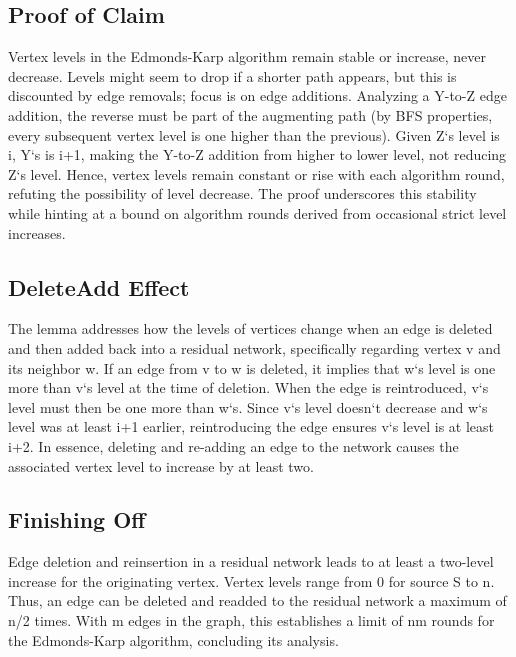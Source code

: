 \subsection*{Proof of Claim}
Vertex levels in the Edmonds-Karp algorithm remain stable or increase, never decrease.
Levels might seem to drop if a shorter path appears, but this is discounted by edge removals; focus is on edge additions.
Analyzing a Y-to-Z edge addition, the reverse must be part of the augmenting path (by BFS properties, every subsequent vertex level is one higher than the previous).
Given Z`s level is i, Y`s is i+1, making the Y-to-Z addition from higher to lower level, not reducing Z`s level.
Hence, vertex levels remain constant or rise with each algorithm round, refuting the possibility of level decrease.
The proof underscores this stability while hinting at a bound on algorithm rounds derived from occasional strict level increases.

\subsection*{DeleteAdd Effect}
The lemma addresses how the levels of vertices change when an edge is deleted and then added back into a residual network, specifically regarding vertex v and its neighbor w.
If an edge from v to w is deleted, it implies that w`s level is one more than v`s level at the time of deletion.
When the edge is reintroduced, v`s level must then be one more than w`s.
Since v`s level doesn`t decrease and w`s level was at least i+1 earlier, reintroducing the edge ensures v`s level is at least i+2.
In essence, deleting and re-adding an edge to the network causes the associated vertex level to increase by at least two.

\subsection*{Finishing Off}
Edge deletion and reinsertion in a residual network leads to at least a two-level increase for the originating vertex.
Vertex levels range from 0 for source S to n.
Thus, an edge can be deleted and readded to the residual network a maximum of n/2 times.
With m edges in the graph, this establishes a limit of nm rounds for the Edmonds-Karp algorithm, concluding its analysis.

